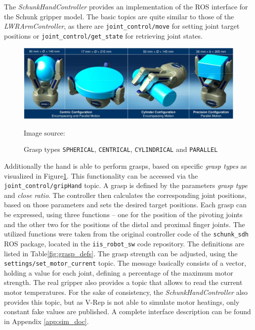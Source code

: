 The \emph{SchunkHandController} provides an implementation of the ROS interface for the Schunk gripper model. The basic topics are quite similar to those of the \emph{LWRArmController}, as there are \texttt{joint\_control/move} for setting joint target positions or \texttt{joint\_control/get\_state} for retrieving joint states.
\begin{figure}[h]
	\centering
  	\includegraphics[width=1.0\textwidth]{images/grasp_types.jpg}
	\caption{Grasp types \texttt{SPHERICAL}, \texttt{CENTRICAL}, \texttt{CYLINDRICAL} and \texttt{PARALLEL}}
	{\scriptsize Image source: \cite{schunk2010}}
	\label{fig:grasp_types}
\end{figure}
Additionally the hand is able to perform grasps, based on specific \emph{grasp types} as visualized in Figure\ref{fig:grasp_types}. This functionality can be accessed via the \texttt{joint\_control/gripHand} topic. A grasp is defined by the parameters \emph{grasp type} and \emph{close ratio}. The controller then calculates the corresponding joint positions, based on those parameters and sets the desired target positions. Each grasp can be expressed, using three functions -- one for the position of the pivoting joints and the other two for the positions of the distal and proximal finger joints. The utilized functions were taken from the original controller code of the \texttt{schunk\_sdh} ROS package, located in the \texttt{iis\_robot\_sw} code repository. The definitions are listed in Table\ref{fig:grasp_defs}. The grasp strength can be adjusted, using the \texttt{settings/set\_motor\_current} topic. The message basically consists of a vector, holding a value for each joint, defining a percentage of the maximum motor strength. The real gripper also provides a topic that allows to read the current motor temperatures. For the sake of consistency, the \emph{SchunkHandController} also provides this topic, but as V-Rep is not able to simulate motor heatings, only constant fake values are published. A complete interface description can be found in Appendix \ref{app:sim_doc}.
